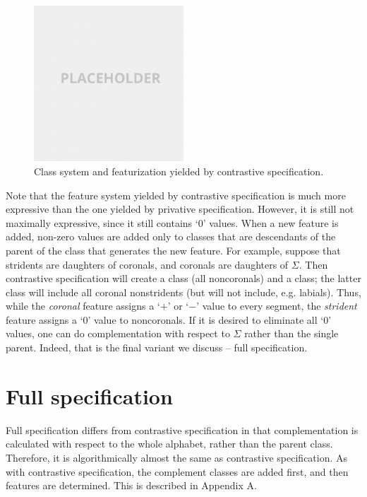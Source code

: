 \documentclass[11pt, oneside]{article}   	%
\begin{document}
\begin{figure}[h]
  \centering
  \includegraphics[width=0.5\textwidth]{placeholder.png}
  \caption{Class system and featurization yielded by contrastive specification.}
  \label{fig:contrastive}
\end{figure}

\noindent Note that the feature system yielded by contrastive specification is much more expressive than the one yielded by privative specification. However, it is still not maximally expressive, since it still contains `$0$' values. When a new feature is added, non-zero values are added only to classes that are descendants of the parent of the class that generates the new feature. For example, suppose that stridents are daughters of coronals, and coronals are daughters of $\Sigma$. Then contrastive specification will create a  class (all noncoronals) and a  class; the latter class will include all coronal nonstridents (but will not include, e.g. labials). Thus, while the \textit{coronal} feature assigns a `$+$' or `$-$' value to every segment, the \textit{strident} feature assigns a `$0$' value to noncoronals. If it is desired to eliminate all `$0$' values, one can do complementation with respect to $\Sigma$ rather than the single parent. Indeed, that is the final variant we discuss -- full specification.

\section{Full specification}

Full specification differs from contrastive specification in that complementation is calculated with respect to the whole alphabet, rather than the parent class. Therefore, it is algorithmically almost the same as contrastive specification. As with contrastive specification, the complement classes are added first, and then features are determined. This is described in Appendix A.
\end{document}
